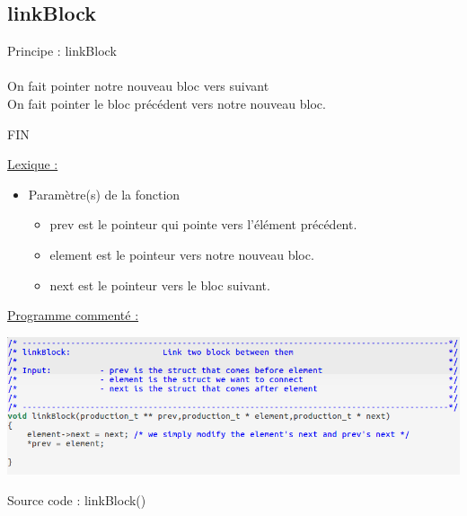 \documentclass[a4paper]{article}
\newcommand\tab[1][1cm]{\hspace*{#1}}
\begin{document}
\subsection{linkBlock}
\begin{algorithm}
Principe : linkBlock
\\
\\
\tab On fait pointer notre nouveau bloc vers suivant
\\
\tab On fait pointer le bloc précédent vers notre nouveau bloc.

FIN
\end{algorithm}
\newpage
\underline{Lexique :}
\begin{itemize}
\item Paramètre(s) de la fonction  
\begin{itemize}
\item prev est le pointeur qui pointe vers l'élément précédent.
\item element est le pointeur vers notre nouveau bloc.
\item next est le pointeur vers le bloc suivant.
\end{itemize}
\end{itemize}
\underline{Programme commenté :}

\begin{center}
\includegraphics[scale=0.39]{linkBlock.png}

Source code : linkBlock()
\end{center}
\end{document}
